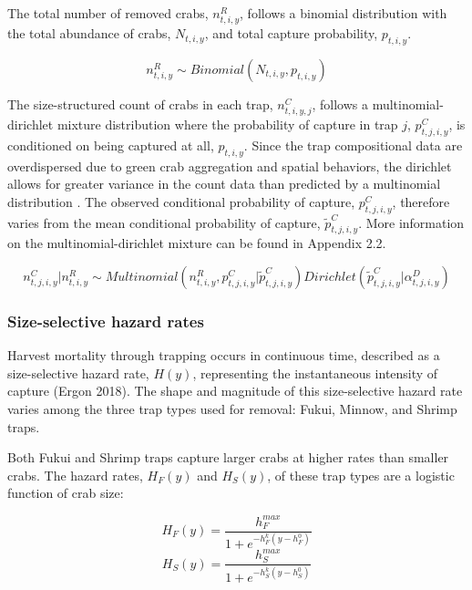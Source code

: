 \documentclass{article}
\begin{document}
The total number of removed crabs, $n^R_{t,i,y}$, follows a binomial distribution with the total abundance of crabs, $N_{t,i,y}$, and total capture probability, $p_{t,i,y}$.

\begin{equation}
n^R_{t,i,y} \sim Binomial(N_{t,i,y}, p_{t,i,y})
\end{equation}

The size-structured count of crabs in each trap, $n^C_{t,i,y,j}$, follows a multinomial-dirichlet mixture distribution where the probability of capture in trap $j$, $p^C_{t,j,i,y}$, is conditioned on being captured at all, $p_{t,i,y}$. Since the trap compositional data are overdispersed due to green crab aggregation and spatial behaviors, the dirichlet allows for greater variance in the count data than predicted by a multinomial distribution \parencite{thorson2017model}. The observed conditional probability of capture, $p^C_{t,j,i,y}$, therefore varies from the mean conditional probability of capture, $\tilde{p}^C_{t,j,i,y}$. More information on the multinomial-dirichlet mixture can be found in Appendix 2.2.

\begin{equation}
n^C_{t,j,i,y} | n^R_{t,i,y} \sim Multinomial(n^R_{t,i,y}, p^C_{t,j,i,y}|\tilde{p}^C_{t,j,i,y})Dirichlet(\tilde{p}^C_{t,j,i,y}| \alpha^D_{t,j,i,y})
\end{equation}

\subsubsection*{Size-selective hazard rates}

Harvest mortality through trapping occurs in continuous time, described as a size-selective hazard rate, $H(y)$, representing the instantaneous intensity of capture (Ergon 2018). The shape and magnitude of this size-selective hazard rate varies among the three trap types used for removal: Fukui, Minnow, and Shrimp traps.

Both Fukui and Shrimp traps capture larger crabs at higher rates than smaller crabs. The hazard rates, $H_F(y)$ and $H_S(y)$, of these trap types are a logistic function of crab size:

\begin{equation}
H_F(y) = \frac{h^{max}_F}{1+e^{-h^k_F(y-h^0_F)}}
\end{equation}
\begin{equation}
H_S(y) = \frac{h^{max}_S}{1+e^{-h^k_S(y-h^0_S)}}
\end{equation}
\end{document}
